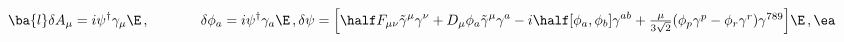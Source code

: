 \begin{equation}
\ba{l}\delta A_{\mu}=i\psi^{\dagger}\gamma_{\mu}\E\,,~~~~~~~~~~~
\delta \phi_{a}=i\psi^{\dagger}\gamma_{a}\E\,,\\
{}\\
\delta\psi=\Big[\half F_{\mu\nu}\tilde{\gamma}^{\mu}\gamma^{\nu}+D_{\mu}\phi_{a}\tilde{\gamma}^{\mu}\gamma^{a}-i\half [\phi_{a},\phi_{b}]\gamma^{ab}
+\textstyle{\frac{\mu}{3\sqrt{2}}}(\phi_{p}\gamma^{p}-\phi_{r}\gamma^{r})\gamma^{789} \Big]\E\,,\ea\label{WVsusytr}
\end{equation}

